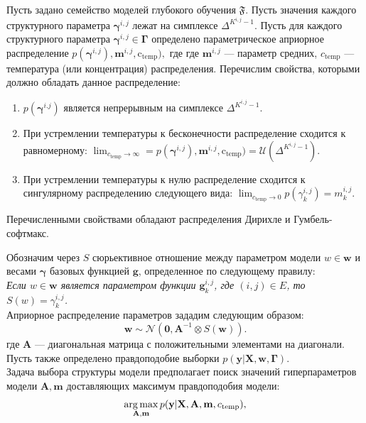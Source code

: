 Пусть задано семейство моделей глубокого обучения $\mathfrak{F}$.
Пусть значения каждого структурного параметра $\boldsymbol{\gamma}^{i,j}$ лежат на симплексе $\Delta^{K^{i,j}-1}$.
Пусть для каждого структурного параметра $\boldsymbol{\gamma}^{i,j} \in \boldsymbol{\Gamma}$ определено параметрическое априорное распределение $p(\boldsymbol{\gamma}^{i,j}), \mathbf{m}^{i,j}, \text{c}_{\text{temp}}),$ где где $\mathbf{m}^{i,j}$ --- параметр средних,  $c_{\text{temp}}$ --- температура (или концентрация) распределения.
Перечислим свойства, которыми должно обладать данное распределение:
\begin{enumerate}
\item $p(\boldsymbol{\gamma}^{i.j})$ является непрерывным на симплексе $\Delta^{K^{i,j}-1}$.
\item При устремлении температуры к бесконечности распределение сходится к равномерному: $\lim_{c_{\text{temp}} \to \infty} = p(\boldsymbol{\gamma}^{i,j}), \mathbf{m}^{i,j}, \text{c}_{\text{temp}}) = \mathcal{U}(\Delta^{K^{i,j}-1}).$
\item При устремлении температуры к нулю распределение сходится к сингулярному распределению следующего вида:
$\lim_{c_{\text{temp}} \to 0}  p(\gamma^{i,j}_k) = m^{i,j}_k.$
\end{enumerate}

\begin{utv}
Перечисленными свойствами обладают распределения Дирихле и Гумбель-софтмакс.
\end{utv}

Обозначим через $S$ сюрьективное отношение между параметром модели $w \in \mathbf{w}$ и весами $\boldsymbol{\gamma}$ базовых функцией $\mathbf{g}$, определенное по следующему правилу:\\
\textit{Если $w \in \mathbf{w}$ является параметром функции $\mathbf{g}^{i,j}_k$, где $(i,j) \in E$, то $S(w) = \gamma^{i,j}_k$.}\\
Априорное распределение параметров  зададим следующим образом:
\[
    \mathbf{w} \sim \mathcal{N}\left(\mathbf{0}, \mathbf{A}^{-1} \otimes S(\mathbf{w})\right).
\]
где $\mathbf{A}$ --- диагональная матрица с положительными элементами на диагонали.
Пусть также определено правдоподобие выборки $p(\mathbf{y}|\mathbf{X}, \mathbf{w}, \boldsymbol{\Gamma}).$\\

Задача выбора структуры модели предполагает поиск значений гиперпараметров модели $\mathbf{A}, \mathbf{m}$ доставляющих максимум правдоподобия модели:
\begin{equation}
\label{eq:evidence_optim}
    \operatorname*{arg\,max}_{\mathbf{A}, \mathbf{m}}  p(\mathbf{y}|\mathbf{X},\mathbf{A},\mathbf{m}, {c_\text{temp}}),
\end{equation}


